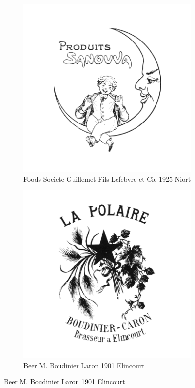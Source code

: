 \begin{figure}[h]
  \centering
  \begin{subfigure}{.45\textwidth}
    \centering
    \includegraphics[width=.5\linewidth]{images/supplement/trademarks/french/8_16}
    \caption{Foods Societe Guillemet Fils Lefebvre et Cie 1925 Niort}
    \label{fig:trademarks:french:8.16}
  \end{subfigure}\hfill
  \begin{subfigure}{.45\textwidth}
    \centering
    \includegraphics[width=.5\linewidth]{images/supplement/trademarks/french/8_25}
    \caption{Beer M. Boudinier Laron 1901 Elincourt}
    \label{fig:trademarks:french:8.25}
  \end{subfigure}


\end{figure}
